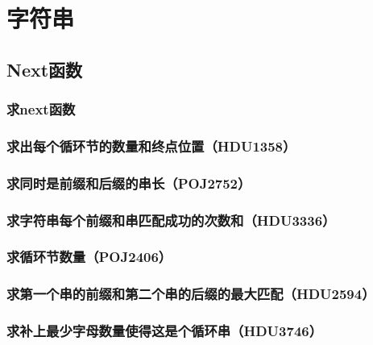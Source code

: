 \documentclass{article}
\begin{document}
\begin{titlepage}

\thispagestyle{empty}
\pagebreak
\pagestyle{plain}
\tableofcontents
\end{titlepage}

\section{字符串}

\subsection{Next函数}
\subsubsection{求next函数}

\subsubsection{求出每个循环节的数量和终点位置（HDU1358）}

\subsubsection{求同时是前缀和后缀的串长（POJ2752）}

\subsubsection{求字符串每个前缀和串匹配成功的次数和（HDU3336）}

\subsubsection{求循环节数量（POJ2406）}

\subsubsection{求第一个串的前缀和第二个串的后缀的最大匹配（HDU2594）}

\subsubsection{求补上最少字母数量使得这是个循环串（HDU3746）}

\end{document}
